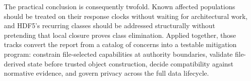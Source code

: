 \documentclass[../main.tex]{subfiles}
\begin{document}
The practical conclusion is consequently twofold. Known affected populations
should be treated on their response clocks without waiting for architectural
work, and HDF5's recurring classes should be addressed structurally without
pretending that local closure proves class elimination. Applied together, those
tracks convert the report from a catalog of concerns into a testable mitigation
program: constrain file-selected capabilities at authority boundaries, validate
file-derived state before trusted object construction, decide compatibility
against normative evidence, and govern privacy across the full data lifecycle.
\end{document}
